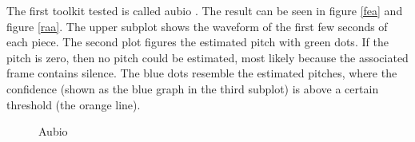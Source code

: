 The first toolkit tested is called aubio \cite{aubio1}. The result can be seen in figure \ref{fea} and figure \ref{raa}.
The upper subplot shows the waveform of the first few seconds of each piece. The second plot figures the estimated pitch with green dots. If the pitch is zero, then no pitch could be estimated, most likely because the associated frame contains silence. The blue dots resemble the estimated pitches, where the confidence (shown as the blue graph in the third subplot) is above a certain threshold (the orange line).
\begin{figure}[htbp]
	\centering
	\caption{Aubio}
	\label{fig:aubio}
\end{figure}
